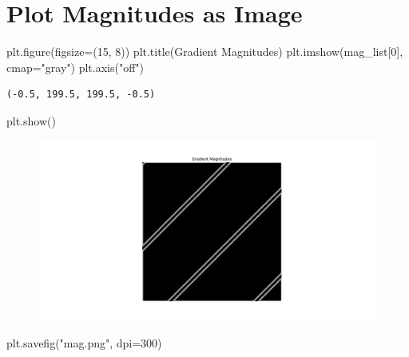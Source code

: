 \documentclass[
  letterpaper,
  DIV=11,
  numbers=noendperiod]{scrreprt}
\newenvironment{Shaded}{\begin{snugshade}}{\end{snugshade}}
\newcommand{\DecValTok}[1]{\textcolor[rgb]{0.68,0.00,0.00}{#1}}
\newcommand{\NormalTok}[1]{\textcolor[rgb]{0.00,0.23,0.31}{#1}}
\newcommand{\OperatorTok}[1]{\textcolor[rgb]{0.37,0.37,0.37}{#1}}
\newcommand{\StringTok}[1]{\textcolor[rgb]{0.13,0.47,0.30}{#1}}
\begin{document}
\hypertarget{plot-magnitudes-as-image}{%
\section{Plot Magnitudes as Image}\label{plot-magnitudes-as-image}}

\begin{Shaded}
\begin{Highlighting}[]
\NormalTok{plt.figure(figsize}\OperatorTok{=}\NormalTok{(}\DecValTok{15}\NormalTok{, }\DecValTok{8}\NormalTok{))}
\NormalTok{plt.title(}\StringTok{\textquotesingle{}Gradient Magnitudes\textquotesingle{}}\NormalTok{)}
\NormalTok{plt.imshow(mag\_list[}\DecValTok{0}\NormalTok{], cmap}\OperatorTok{=}\StringTok{"gray"}\NormalTok{)}
\NormalTok{plt.axis(}\StringTok{"off"}\NormalTok{)}
\end{Highlighting}
\end{Shaded}

\begin{verbatim}
(-0.5, 199.5, 199.5, -0.5)
\end{verbatim}

\begin{Shaded}
\begin{Highlighting}[]
\NormalTok{plt.show()}
\end{Highlighting}
\end{Shaded}

\begin{figure}[H]

{\centering \includegraphics{results_files/figure-pdf/unnamed-chunk-8-1.pdf}

}

\end{figure}

\begin{Shaded}
\begin{Highlighting}[]

\NormalTok{plt.savefig(}\StringTok{"mag.png"}\NormalTok{, dpi}\OperatorTok{=}\DecValTok{300}\NormalTok{)}
\end{Highlighting}
\end{Shaded}
\end{document}
